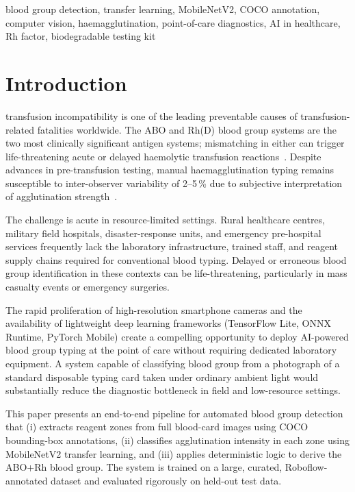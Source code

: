 \documentclass[journal]{IEEEtran}
\begin{document}
\begin{IEEEkeywords}
blood group detection, transfer learning, MobileNetV2,
COCO annotation, computer vision, haemagglutination,
point-of-care diagnostics, AI in healthcare, Rh factor,
biodegradable testing kit
\end{IEEEkeywords}

\section{Introduction}
\label{sec:intro}

 transfusion incompatibility is one of the
leading preventable causes of transfusion-related fatalities worldwide.
The ABO and Rh(D) blood group systems are the two most clinically
significant antigen systems; mismatching in either can trigger
life-threatening acute or delayed haemolytic transfusion
reactions~\cite{lippi2011}.
Despite advances in pre-transfusion testing, manual haemagglutination
typing remains susceptible to inter-observer variability of 2--5\,\%
due to subjective interpretation of agglutination
strength~\cite{harmening2019}.

The challenge is acute in resource-limited settings.
Rural healthcare centres, military field hospitals, disaster-response
units, and emergency pre-hospital services frequently lack the
laboratory infrastructure, trained staff, and reagent supply chains
required for conventional blood typing.
Delayed or erroneous blood group identification in these contexts
can be life-threatening, particularly in mass casualty events
or emergency surgeries.

The rapid proliferation of high-resolution smartphone cameras
and the availability of lightweight deep learning frameworks
(TensorFlow Lite, ONNX Runtime, PyTorch Mobile) create a compelling
opportunity to deploy AI-powered blood group typing at the point of
care without requiring dedicated laboratory equipment.
A system capable of classifying blood group from a photograph of a
standard disposable typing card taken under ordinary ambient light
would substantially reduce the diagnostic bottleneck in field
and low-resource settings.

This paper presents an end-to-end pipeline for automated blood group
detection that (i) extracts reagent zones from full blood-card images
using COCO bounding-box annotations, (ii) classifies agglutination
intensity in each zone using MobileNetV2 transfer learning, and
(iii) applies deterministic logic to derive the ABO+Rh blood group.
The system is trained on a large, curated, Roboflow-annotated dataset
and evaluated rigorously on held-out test data.
\end{document}
